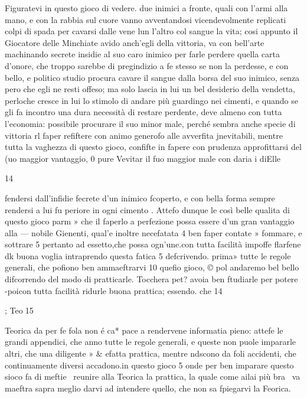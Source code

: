 \documentclass[12pt,a6paper]{article}
\begin{document}
Figuratevi in questo gioco di
vedere. due inimici a fronte,
quali con l'armi alla mano, e
con la rabbia sul cuore vanno
avventandosi vicendevolmente
replicati colpi di spada per
cavarsi dalle vene lun l'altro col
sangue la vita; cosi appunto il
Giocatore delle Minchiate avido
anch’egli della vittoria, va
con bell'arte machinando secrete
insidie al suo caro inimico
per farle perdere quella carta
d'onore, che troppo sarebbe
di pregindizio a fe stesso se non
la perdesse, e con bello, e politico
studio procura cavare il
sangue dalla borsa del suo
inimico, senza pero che egli ne
resti offeso; ma solo lascia in lui
un bel desiderio della vendetta,
perloche cresce in lui lo stimolo
di andare più guardingo nei
cimenti, e quando se gli fa incontro
una dura necessità di restare
perdente, deve almeno
con tutta l'economia: possibile
procurare il suo minor male,
perché sembra anche specie di
vittoria rl faper refiftere con
animo generofo alle avverfita
jnevitabili, mentre tutta la vaghezza di questo gioco, confifte
in fapere con prudenza approfittarsi del (uo maggior vantaggio, 0 pure Vevitar il fuo maggior male con daria i diElle
 

 

14

fendersi dall’infidie fecrete d'un
inimico fcoperto, e con bella
forma sempre rendersi a lui fu
periore in ogni cimento .
Attefo dunque le così belle
qualita di questo gioco parm »
che il faperlo a perfezione possa
essere d’un gran vantaggio alla —
nobile Gienenti, qual’e inoltre
necefatata 4 ben faper contate »
fommare, e sottrare 5 pertanto
ad essetto,che possa ogn’une.con
tutta facilità impoffe flarfene dk
buona voglia intraprendo questa fatica 5 defcrivendo. prima»
tutte le regole generali, che
pofiono ben ammaeftrarvi 10
quefio gioco, © pol andaremo
bel bello difcorrendo del modo
di pratticarle. Tocchera pet?
avoia ben ftudiarle per potere
-poicon tutta facilità ridurle
buona prattica; essendo. che 14

; Teo15

Teorica da per fe fola non é ca*
pace a rendervene informatia
pieno: attefe le grandi appendici, che anno tutte le regole generali, e queste non puole impararle altri, che una diligente »
& efatta prattica, mentre ndscono da foli accidenti, che continuamente diversi accadono.in
questo gioco 5 onde per ben imparare questo sioco fa di meftie~
reunire alla Teorica la prattica, la quale come ailai più bra~
va maeftra sapra meglio darvi
ad intendere quello, che non sa
fpiegarvi la Feorica.
\end{document}
